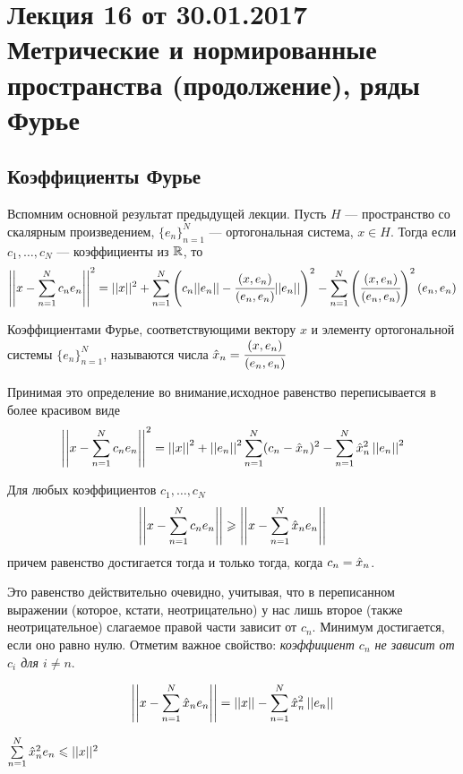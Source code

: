 \documentclass[a4paper, 12pt]{article}
\begin{document}
\pagestyle{fancy}
\section{Лекция 16 от 30.01.2017 \\ Метрические и нормированные пространства (продолжение), ряды Фурье}
\subsection{Коэффициенты Фурье}
Вспомним основной результат предыдущей лекции. Пусть $H$ --- пространство со скалярным произведением, $\{e_n\}_{n=1}^{N}$ --- ортогональная система, $x \in H$. Тогда если $c_1, \ldots, c_N$ --- коэффициенты из $\mathbb{R}$, то 
\begin{gather*}
    \left|\left|x - \sum\limits_{n= 1}^{N}c_ne_n\right|\right|^2 = ||x||^2 +\sum\limits_{n=1}^{N}\left(c_n||e_n|| - \cfrac{(x, e_n)}{(e_n, e_n)}||e_n||\right)^2 - \sum\limits_{n =1 }^{N} \left(\cfrac{(x, e_n)}{(e_n, e_n)}\right)^2(e_n, e_n)
\end{gather*}
\begin{Def}
    Коэффициентами Фурье, соответствующими вектору $x$ и элементу ортогональной системы $\{e_n\}_{n=1}^{N}$, называются числа $\hat{x}_n = \cfrac{(x, e_n)}{(e_n, e_n)}$
\end{Def}
Принимая это определение во внимание,исходное равенство переписывается в более красивом виде
\begin{gather*}
    \left|\left|x - \sum\limits_{n= 1}^{N}c_ne_n\right|\right|^2 = \left|\left|x\right|\right|^2 + \left|\left|e_n\right|\right|^2 \sum\limits_{n=1}^{N}(c_n - \hat{x}_n)^2 - \sum\limits_{n =1}^{N}\hat{x}_n^2 
    \left|\left|e_n\right|\right|^2
\end{gather*}
\begin{Statement}[очевидное]
    Для любых коэффициентов $c_1, \ldots, c_N$
    $$
        \left|\left| x - \sum\limits_{n=1}^{N}c_n e_n\right|\right|\geqslant \left|\left|x -  \sum\limits_{n=1}^{N}\hat{x}_n e_n\right|\right|
    $$
    причем равенство достигается тогда и только тогда, когда $c_n = \hat{x}_n$.
\end{Statement}
Это равенство действительно очевидно, учитывая, что в переписанном выражении (которое, кстати, неотрицательно) у нас лишь второе (также неотрицательное) слагаемое правой части зависит от $c_n$. Минимум достигается, если оно равно нулю.
Отметим важное свойство: \textit{коэффициент $c_n$ не зависит от $c_i$ для $i \neq n$}.
\begin{Statement}
    $$
        \left|\left|x - \sum\limits_{n=1}^{N}\hat{x}_ne_n\right|\right| = \left|\left|x\right|\right| - \sum\limits_{n=1}^{N} \hat{x}_n^2 \left|\left|e_n\right|\right|
    $$
\end{Statement}
\begin{Consequence}
    $\sum\limits_{n=1}^{N} \hat{x}_n^2e_n\leqslant ||x||^2$
\end{Consequence}
\end{document}
